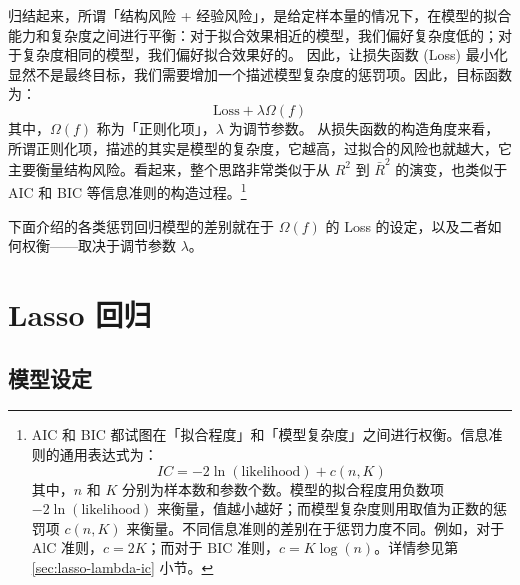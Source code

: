 归结起来，所谓「结构风险 + 经验风险」，是给定样本量的情况下，在模型的拟合能力和复杂度之间进行平衡：对于拟合效果相近的模型，我们偏好复杂度低的；对于复杂度相同的模型，我们偏好拟合效果好的。
因此，让损失函数 (Loss) 最小化显然不是最终目标，我们需要增加一个描述模型复杂度的惩罚项。因此，目标函数为：
\begin{equation}\label{eq:Lasso-08}
	\text{Loss}+\lambda \Omega(f)
\end{equation}
其中，$\Omega(f)$ 称为「正则化项」，$\lambda$ 为调节参数。
从损失函数的构造角度来看，所谓正则化项，描述的其实是模型的复杂度，它越高，过拟合的风险也就越大，它主要衡量结构风险。看起来，整个思路非常类似于从 $R^2$ 到 $\bar{R}^2$ 的演变，也类似于 AIC 和 BIC 等信息准则的构造过程。\footnote{%
      AIC 和 BIC 都试图在「拟合程度」和「模型复杂度」之间进行权衡。信息准则的通用表达式为：
        $$
        IC = -2\ln(\mathrm{likelihood}) + c(n, K)
        $$
      其中，$n$ 和 $K$ 分别为样本数和参数个数。模型的拟合程度用负数项 $-2\ln(\mathrm{likelihood})$ 来衡量，值越小越好；而模型复杂度则用取值为正数的惩罚项 $c(n, K)$ 来衡量。不同信息准则的差别在于惩罚力度不同。例如，对于 $\mathrm{AlC}$ 准则，$c=2 K$；而对于 $\mathrm{BIC}$ 准则，$c=K \log (n)$。详情参见第 \ref{sec:lasso-lambda-ic} 小节。
      }

下面介绍的各类惩罚回归模型的差别就在于 $\Omega(f)$ 的 Loss 的设定，以及二者如何权衡——取决于调节参数 $\lambda$。


\section{Lasso 回归}


\subsection{模型设定} 


